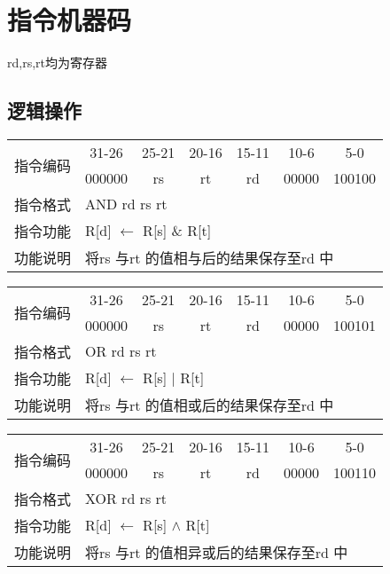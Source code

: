 \section{指令机器码}
rd,rs,rt均为寄存器
\subsection{逻辑操作}
	\begin{table}[!hbp]
		\centering
		\begin{tabular}{|c|c|c|c|c|c|c|}
		\hline
		\multirow{2}{*}{指令编码} & 31-26&25-21 & 20-16&15-11 &10-6 &5-0\\
		\cline{2-7} & 000000 & rs & rt & rd & 00000 & 100100 \\
		\hline
		指令格式&\multicolumn{6}{|l|}{AND rd rs rt}\\
		\hline		
		指令功能&\multicolumn{6}{|l|}{R[d] $\leftarrow$ R[s] \& R[t]}\\
		\hline		
		功能说明&\multicolumn{6}{|l|}{将rs 与rt 的值相与后的结果保存至rd 中}\\
		\hline
		\end{tabular}
	\end{table}
	\begin{table}[!hbp]
		\centering
		\begin{tabular}{|c|c|c|c|c|c|c|}
		\hline
		\multirow{2}{*}{指令编码} & 31-26&25-21 & 20-16&15-11 &10-6 &5-0\\
		\cline{2-7} & 000000 & rs & rt & rd & 00000 & 100101 \\
		\hline
		指令格式&\multicolumn{6}{|l|}{OR rd rs rt}\\
		\hline		
		指令功能&\multicolumn{6}{|l|}{R[d] $\leftarrow$ R[s] $|$ R[t]}\\
		\hline		
		功能说明&\multicolumn{6}{|l|}{将rs 与rt 的值相或后的结果保存至rd 中}\\
		\hline
		\end{tabular}
	\end{table}
	\begin{table}[!hbp]
		\centering
		\begin{tabular}{|c|c|c|c|c|c|c|}
		\hline
		\multirow{2}{*}{指令编码} & 31-26&25-21 & 20-16&15-11 &10-6 &5-0\\
		\cline{2-7} & 000000 & rs & rt & rd & 00000 & 100110 \\
		\hline
		指令格式&\multicolumn{6}{|l|}{XOR rd rs rt}\\
		\hline		
		指令功能&\multicolumn{6}{|l|}{R[d] $\leftarrow$ R[s] $\land$ R[t]}\\
		\hline		
		功能说明&\multicolumn{6}{|l|}{将rs 与rt 的值相异或后的结果保存至rd 中}\\
		\hline
		\end{tabular}
	\end{table}
